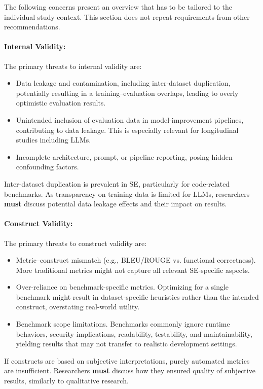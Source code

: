 \documentclass[smallextended]{svjour3}
\newcommand{\must}{\textbf{must}\xspace}
\begin{document}
The following concerns present an overview that has to be tailored to the individual study context. This section does not repeat requirements from other recommendations.

\paragraph{Internal Validity:}
The primary threats to internal validity are:
\begin{itemize}
	\item Data leakage and contamination, including inter-dataset duplication, potentially resulting in a training–evaluation overlaps, leading to overly optimistic evaluation results.
	\item Unintended inclusion of evaluation data in model-improvement pipelines, contributing to data leakage. This is especially relevant for longitudinal studies including LLMs.
	\item Incomplete architecture, prompt, or pipeline reporting, posing hidden confounding factors.
\end{itemize}

Inter-dataset duplication is prevalent in SE, particularly for code-related benchmarks. As transparency on training data is limited for LLMs, researchers \must discuss potential data leakage effects and their impact on results.

\paragraph{Construct Validity:}
The primary threats to construct validity are:
\begin{itemize}
	\item Metric–construct mismatch (e.g., BLEU/ROUGE vs. functional correctness). More traditional metrics might not capture all relevant SE-specific aspects.
	\item Over-reliance on benchmark-specific metrics. Optimizing for a single benchmark might result in dataset-specific heuristics rather than the intended construct, overstating real-world utility.
	\item Benchmark scope limitations. Benchmarks commonly ignore runtime behaviors, security implications, readability, testability, and maintainability, yielding results that may not transfer to realistic development settings.
\end{itemize}

If constructs are based on subjective interpretations, purely automated metrics are insufficient. Researchers \must discuss how they ensured quality of subjective results, similarly to qualitative research.
\end{document}
